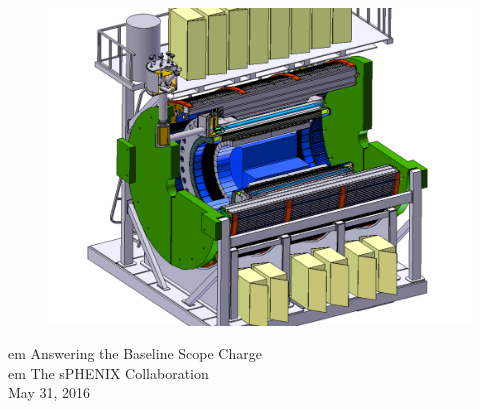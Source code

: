 \renewcommand*\familydefault{\sfdefault}
{\sffamily
\vfill
\vspace{4cm}
\begin{figure}[H]
  \begin{center}
    \includegraphics[width=\linewidth]{figs/sPHENIX}
  \end{center}
\end{figure}

\begin{center}
  \LARGE
   em
  Answering the Baseline Scope Charge\\
   em
  The sPHENIX Collaboration \\
  May 31, 2016 \\
\end{center}

\vspace{2cm}

\begin{figure}[H]
  \begin{center}
  \end{center}
\end{figure}
}


\vfill
\renewcommand*\familydefault{\rmdefault}
